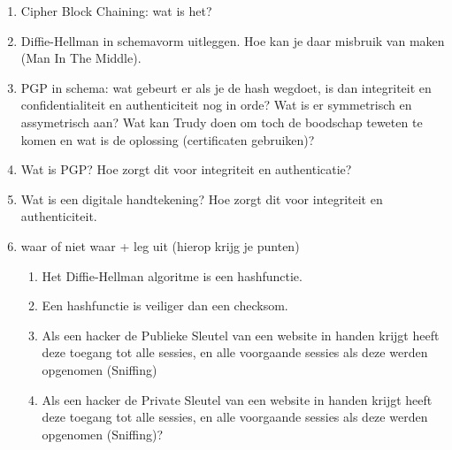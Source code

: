 \begin{enumerate}

\item Cipher Block Chaining: wat is het?


\item Diffie-Hellman in schemavorm uitleggen. Hoe kan je daar misbruik van maken (Man In The Middle).


\item PGP in schema: wat gebeurt er als je de hash wegdoet, is dan integriteit en confidentialiteit en authenticiteit nog in orde? Wat is er symmetrisch en assymetrisch aan? Wat kan Trudy doen om toch de boodschap teweten te komen en wat is de oplossing (certificaten gebruiken)?


\item Wat is PGP? Hoe zorgt dit voor integriteit en authenticatie?


\item Wat is een digitale handtekening? Hoe zorgt dit voor integriteit en authenticiteit.


\clearpage

\item	waar of niet waar + leg uit (hierop krijg je punten)
    \begin{enumerate} %
        \item Het Diffie-Hellman algoritme is een hashfunctie.


        \item Een hashfunctie is veiliger dan een checksom.


        \item Als een hacker de Publieke Sleutel van een website in handen krijgt heeft deze toegang tot alle sessies, en alle voorgaande sessies als deze werden opgenomen (Sniffing)


        \item Als een hacker de Private Sleutel van een website in handen krijgt heeft deze toegang tot alle sessies, en alle voorgaande sessies als deze werden opgenomen (Sniffing)?


\end{enumerate}
\end{enumerate}

